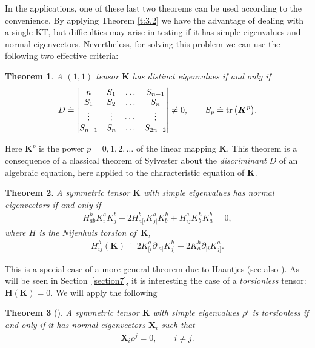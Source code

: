 \documentclass[pdftex]{sigma}
\def\bs{\boldsymbol}
\numberwithin{equation}{section}
\newtheorem{Theorem}{Theorem}[section]
 { \theoremstyle{definition}
\newtheorem{Notation}[Theorem]{Notation}
\newtheorem{Example}[Theorem]{Example}
\newtheorem{Remark}[Theorem]{Remark}
\newtheorem{Remarks}[Theorem]{Remarks}
 }
\begin{document}
In the applications, one of these last two theorems can be used according to the convenience. By applying Theorem \ref{t:3.2} we have the advantage of dealing with a single KT, but dif\/f\/iculties may arise in testing if it has simple eigenvalues and normal eigenvectors. Nevertheless, for solving this problem we can use the following two ef\/fective criteria:

\begin{Theorem}\label{t:3.6}
A $(1,1)$ tensor $\bs K$ has distinct eigenvalues if and only if
\begin{gather*}
D\doteq \vmatrix
n & S_1 & \ldots & S_{n-1} \cr
S_1 & S_2 & \ldots & S_n \cr
\vdots & \vdots & \cdots & \vdots\cr
S_{n-1} & S_n & \ldots & S_{2n-2}
\endvmatrix\neq 0, \qquad S_p\doteq \operatorname{tr}\big(\bs K^p\big).
\end{gather*}
 \end{Theorem}

Here $\bs K^p$ is the power $p=0,1,2,\ldots$ of the linear mapping $\bs K$. This theorem is a consequence of a classical theorem of Sylvester about the {\it discriminant} $D$ of an algebraic equation, here applied to the characteristic equation of $\bs K$.

\begin{Theorem}\label{t:3.7}
A symmetric tensor $\bs K$ with simple eigenvalues has normal eigenvectors if and only if
\begin{gather*}
H_{ab}^h   K^a_i K^b_j+2  H_{a[i}^b   K^a_{j]}   K^h_b+ H^a_{ij}  K^h_b K^b_a=0,
\end{gather*}
where $H$ is the Nijenhuis torsion of~$\bs K$,
\begin{gather*}
H_{ij}^h(\bs K)\doteq 2  K^a_{[i} \partial_{|a|}K_{j]}^h-2  K^h_a \partial_{[i}K^a_{j]}.
\end{gather*}
\end{Theorem}

This is a special case of a more general theorem due to Haantjes \cite{Haantjes-1955} (see also \cite[p.~248]{Schouten-1954}). As will be seen in Section~\ref{section7}, it is interesting the case of a {\it torsionless} tensor: $\bs H(\bs K)=0$. We will apply the following

\begin{Theorem}[\cite{Nijenhuis-1951}]\label{t:3.8}
A symmetric tensor $\bs K$ with simple eigenvalues $\rho^i$ is torsionless if and only if it has normal eigenvectors
$\bs X_i$ such that
\begin{gather*}
\bs X_i \rho^j=0, \qquad i\neq j.
\end{gather*}
\end{Theorem}
\end{document}

